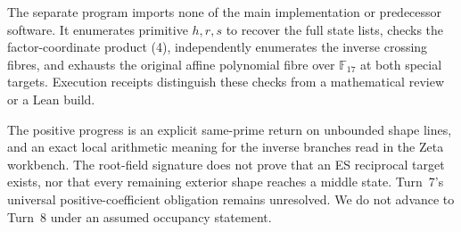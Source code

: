 The separate program imports none of the main implementation or predecessor
software. It enumerates primitive $h,r,s$ to recover the full state lists,
checks the factor-coordinate product (4), independently enumerates the inverse
crossing fibres, and exhausts the original affine polynomial fibre over
$\mathbb F_{17}$ at both special targets. Execution receipts distinguish these
checks from a mathematical review or a Lean build.

The positive progress is an explicit same-prime return on unbounded shape lines,
and an exact local arithmetic meaning for the inverse branches read in the Zeta
workbench. The root-field signature does not prove that an ES reciprocal target
exists, nor that every remaining exterior shape reaches a middle state.
Turn~7's universal positive-coefficient obligation remains unresolved. We do not
advance to Turn~8 under an assumed occupancy statement.

